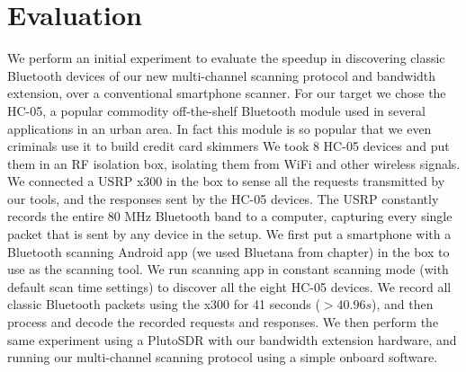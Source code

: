 \section{Evaluation}
\label{sec:hyperscanner:eval}
We perform an initial experiment to evaluate the speedup in discovering classic Bluetooth devices of our new multi-channel scanning protocol and bandwidth extension, over a conventional smartphone scanner.
%
For our target we chose the HC-05, a popular commodity off-the-shelf Bluetooth module used in several applications in an urban area. 
%
In fact this module is so popular that we even criminals use it to build credit card skimmers
%
We took 8 HC-05 devices and put them in an RF isolation box, isolating them from WiFi and other wireless signals.
%
We connected a USRP x300 in the box to sense all the requests transmitted by our tools, and the responses sent by the HC-05 devices.
% 
The USRP constantly records the entire 80 MHz Bluetooth band to a computer, capturing every single packet that is sent by any device in the setup.
% 
We first put a smartphone with a Bluetooth scanning Android app (we used Bluetana from chapter) in the box to use as the scanning tool.
%
We run scanning app in constant scanning mode (with default scan time settings) to discover all the eight HC-05 devices.
%
We record all classic Bluetooth packets using the x300 for 41 seconds ($>40.96s$), and then process and decode the recorded requests and responses.
%
We then perform the same experiment using a PlutoSDR with our bandwidth extension hardware, and running our multi-channel scanning protocol using a simple onboard software.
%

